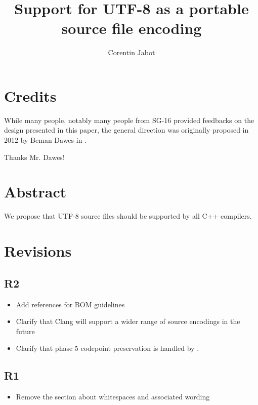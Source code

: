 \documentclass{wg21}
\title{Support for UTF-8 as a portable source file encoding}
\author{Corentin Jabot}{corentin.jabot@gmail.com}
\begin{document}
    
\maketitle


\section{Credits}

While many people, notably many people from SG-16 provided feedbacks on the design presented in this paper,
the general direction was originally proposed in 2012 by Beman Dawes in .

Thanks Mr. Dawes!

\section{Abstract}

We propose that UTF-8 source files should be supported by all C++ compilers.

\section{Revisions}

\subsection{R2}
\begin{itemize}
    \item Add references for BOM guidelines
    \item Clarify that Clang will support a wider range of source encodings in the future
    \item Clarify that phase 5 codepoint preservation is handled by .
\end{itemize}

\subsection{R1}
\begin{itemize}
    \item Remove the section about whitespaces and associated wording
\end{itemize}
\end{document}
